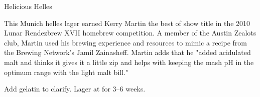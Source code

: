 \begin{recipe}{Helicious Helles}

\begin{aboutblock}
This Munich helles lager earned Kerry Martin the best of show title in the 2010
Lunar Rendezbrew XVII homebrew competition. A member of the Austin Zealots club,
Martin used his brewing experience and resources to mimic a recipe from the
Brewing Network's Jamil Zainasheff. Martin adds that he "added acidulated
malt and thinks it gives it a little zip and helps with keeping the mash pH in
the optimum range with the light malt bill." \sourceaha
\end{aboutblock}


\begin{methodandtiming}
 
\begin{mashsteps}
\end{mashsteps}

\begin{fermentationsteps}
\end{fermentationsteps}

\begin{directions}
Add gelatin to clarify. Lager at  for 3--6 weeks.
\end{directions}

\end{methodandtiming}

\recipebreak

\begin{ingredientsblock}

\begin{malts}
\end{malts}

\begin{hops}
\end{hops}


\end{ingredientsblock}

\end{recipe}

